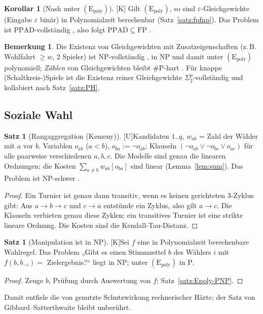 \documentclass[a4paper,12pt]{article}
\theoremstyle{definition}
\newtheorem{satz}[definition]{Satz}
\newtheorem{korollar}[definition]{Korollar}
\newtheorem{bemerkung}[definition]{Bemerkung}
\newcommand{\tU}{\textsf{\small[U]}}   %
\newcommand{\tK}{\textsf{\small[K]}}   %
\newcommand{\cP}{\ensuremath{\mathrm{P}}}
\newcommand{\cNP}{\ensuremath{\mathrm{NP}}}
\newcommand{\cFP}{\ensuremath{\mathrm{FP}}}
\newcommand{\cPPAD}{\ensuremath{\mathrm{PPAD}}}
\newcommand{\sharpP}{\ensuremath{\#\mathrm{P}}}
\newcommand{\Epoly}{(\mathrm{E}_{\mathrm{poly}})}
\begin{document}
\begin{korollar}[Nash unter \(\Epoly\)]\tK
Gilt \(\Epoly\), so sind \(\varepsilon\)-Gleichgewichte (Eingabe \(\varepsilon\) binär) in Polynomialzeit berechenbar (Satz~\ref{satz:fpfnp}). Das Problem ist \(\cPPAD\)-vollständig \cite{daskalakis2009,chen2009}, also folgt \(\cPPAD\subseteq\cFP\) \cite{papadimitriou1994b,megiddo1991}.
\end{korollar}
\begin{bemerkung}
Die Existenz von Gleichgewichten mit Zusatzeigenschaften (z.\,B. Wohlfahrt \(\ge w\), 2 Spieler) ist \cNP-vollständig \cite{gilboa1989,conitzer2008}, in \(\cNP\) und damit unter \(\Epoly\) polynomiell; \emph{Zählen} von Gleichgewichten bleibt \(\sharpP\)-hart \cite{conitzer2008}. Für knappe (Schaltkreis-)Spiele ist die Existenz reiner Gleichgewichte \(\Sigma_2^p\)-vollständig \cite{schoenebeck2006} und kollabiert nach Satz~\ref{satz:PH}.
\end{bemerkung}

\subsection{Soziale Wahl}
\begin{satz}[Rangaggregation (Kemeny)]\tU\label{satz:kemeny}
Kandidaten \(1..q\), \(w_{ab}\) = Zahl der Wähler mit \(a\) vor \(b\). Variablen \(o_{ab}\) (\(a<b\)), \(o_{ba}:=\neg o_{ab}\); Klauseln \((\neg o_{ab}\vee\neg o_{bc}\vee o_{ac})\) für alle paarweise verschiedenen \(a,b,c\). Die Modelle sind genau die linearen Ordnungen; die Kosten \(\sum_{a\ne b}w_{ab}[o_{ba}]\) sind linear (Lemma~\ref{lem:sum}). Das Problem ist \cNP-schwer \cite{bartholdi1989a}.
\end{satz}
\begin{proof}
Ein Turnier ist genau dann transitiv, wenn es keinen gerichteten 3-Zyklus gibt: Aus \(a\to b\to c\) und \(c\to a\) entstünde ein Zyklus, also gilt \(a\to c\). Die Klauseln verbieten genau diese Zyklen; ein transitives Turnier ist eine strikte lineare Ordnung. Die Kosten sind die Kendall-Tau-Distanz.
\end{proof}

\begin{satz}[Manipulation ist in \(\cNP\)]\tK\label{satz:manip}
Sei \(f\) eine in Polynomialzeit berechenbare Wahlregel. Das Problem „Gibt es einen Stimmzettel \(b\) des Wählers \(i\) mit \(f(b,b_{-i})=\) Zielergebnis?“ liegt in \(\cNP\); unter \(\Epoly\) in \(\cP\).
\end{satz}
\begin{proof}
Zeuge \(b\), Prüfung durch Auswertung von \(f\); Satz~\ref{satz:Epoly-PNP}.
\end{proof}
Damit entfiele die von \cite{bartholdi1989b} genutzte Schutzwirkung rechnerischer Härte; der Satz von Gibbard–Satterthwaite \cite{gibbard1973,satterthwaite1975} bleibt unberührt.
\end{document}
